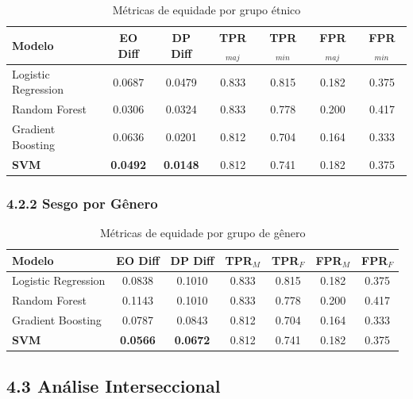 \documentclass[12pt,a4paper]{article}
\begin{document}
\begin{table}[H]
\centering
\caption{Métricas de equidade por grupo étnico}
\begin{tabular}{lcccccc}
\toprule
\textbf{Modelo} & \textbf{EO Diff} & \textbf{DP Diff} & \textbf{TPR$_{maj}$} & \textbf{TPR$_{min}$} & \textbf{FPR$_{maj}$} & \textbf{FPR$_{min}$} \\
\midrule
Logistic Regression & 0.0687 & 0.0479 & 0.833 & 0.815 & 0.182 & 0.375 \\
Random Forest & 0.0306 & 0.0324 & 0.833 & 0.778 & 0.200 & 0.417 \\
Gradient Boosting & 0.0636 & 0.0201 & 0.812 & 0.704 & 0.164 & 0.333 \\
\textbf{SVM} & \textbf{0.0492} & \textbf{0.0148} & 0.812 & 0.741 & 0.182 & 0.375 \\
\bottomrule
\end{tabular}
\label{tab:ethnicity_bias}
\end{table}

\subsubsection{4.2.2 Sesgo por Gênero}

\begin{table}[H]
\centering
\caption{Métricas de equidade por grupo de gênero}
\begin{tabular}{lcccccc}
\toprule
\textbf{Modelo} & \textbf{EO Diff} & \textbf{DP Diff} & \textbf{TPR$_{M}$} & \textbf{TPR$_{F}$} & \textbf{FPR$_{M}$} & \textbf{FPR$_{F}$} \\
\midrule
Logistic Regression & 0.0838 & 0.1010 & 0.833 & 0.815 & 0.182 & 0.375 \\
Random Forest & 0.1143 & 0.1010 & 0.833 & 0.778 & 0.200 & 0.417 \\
Gradient Boosting & 0.0787 & 0.0843 & 0.812 & 0.704 & 0.164 & 0.333 \\
\textbf{SVM} & \textbf{0.0566} & \textbf{0.0672} & 0.812 & 0.741 & 0.182 & 0.375 \\
\bottomrule
\end{tabular}
\label{tab:gender_bias}
\end{table}

\subsection{4.3 Análise Interseccional}
\end{document}

